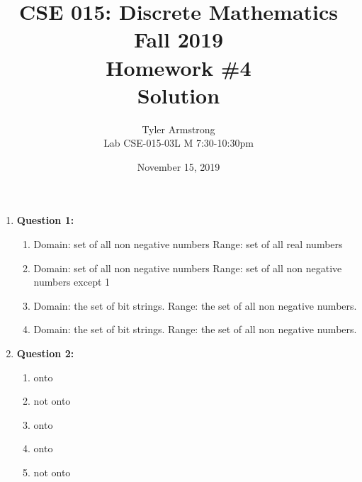 \documentclass[11pt]{article}
\begin{document}
\author{Tyler Armstrong\\
Lab CSE-015-03L M 7:30-10:30pm}

\title{CSE 015: Discrete Mathematics\\
Fall 2019\\
Homework \#4\\
Solution}

\date{November 15, 2019}
\maketitle

\begin{enumerate}

\item
\textbf{Question 1:}

\begin{enumerate}[label=(\alph*)]
\item
Domain: set of all non negative numbers Range: set of all real numbers

\item
Domain: set of all non negative numbers Range: set of all non negative numbers except 1  

\item 
Domain: the set of bit strings. Range: the set of all non negative numbers. 

\item
Domain: the set of bit strings. Range: the set of all non negative numbers.

\end{enumerate}

\item
\textbf{Question 2:}

\begin{enumerate}[label=(\alph*)]
\item
onto 

\item
not onto 

\item 
onto 

\item 
onto 

\item
not onto

\end{enumerate}


\end{enumerate}
\end{document}
